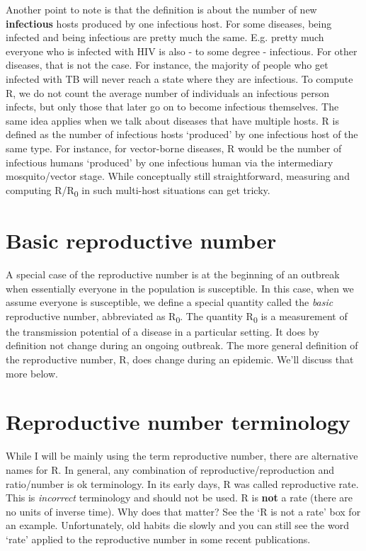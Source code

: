 \documentclass[
]{book}
\begin{document}
Another point to note is that the definition is about the number of new \textbf{infectious} hosts produced by one infectious host. For some diseases, being infected and being infectious are pretty much the same. E.g. pretty much everyone who is infected with HIV is also - to some degree - infectious. For other diseases, that is not the case. For instance, the majority of people who get infected with TB will never reach a state where they are infectious. To compute R, we do not count the average number of individuals an infectious person infects, but only those that later go on to become infectious themselves. The same idea applies when we talk about diseases that have multiple hosts. R is defined as the number of infectious hosts `produced' by one infectious host of the same type. For instance, for vector-borne diseases, R would be the number of infectious humans `produced' by one infectious human via the intermediary mosquito/vector stage. While conceptually still straightforward, measuring and computing R/R\textsubscript{0} in such multi-host situations can get tricky.

\hypertarget{basic-reproductive-number}{%
\section{Basic reproductive number}\label{basic-reproductive-number}}

A special case of the reproductive number is at the beginning of an outbreak when essentially everyone in the population is susceptible. In this case, when we assume everyone is susceptible, we define a special quantity called the \emph{basic} reproductive number, abbreviated as R\textsubscript{0}.
The quantity R\textsubscript{0} is a measurement of the transmission potential of a disease in a particular setting. It does by definition not change during an ongoing outbreak. The more general definition of the reproductive number, R, does change during an epidemic. We'll discuss that more below.

\hypertarget{reproductive-number-terminology}{%
\section{Reproductive number terminology}\label{reproductive-number-terminology}}

While I will be mainly using the term reproductive number, there are alternative names for R. In general, any combination of reproductive/reproduction and ratio/number is ok terminology. In its early days, R was called reproductive rate. This is \emph{incorrect} terminology and should not be used. R is \textbf{not} a rate (there are no units of inverse time). Why does that matter? See the `R is not a rate' box for an example. Unfortunately, old habits die slowly and you can still see the word `rate' applied to the reproductive number in some recent publications.
\end{document}
